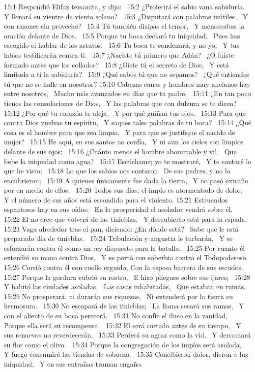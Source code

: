 15:1 Respondió Elifaz temanita, y dijo:  
15:2 ¿Proferirá el sabio vana sabiduría,  
Y llenará su vientre de viento solano?  
15:3 ¿Disputará con palabras inútiles,  
Y con razones sin provecho?  
15:4 Tú también disipas el temor,  
Y menoscabas la oración delante de Dios.  
15:5 Porque tu boca declaró tu iniquidad,  
Pues has escogido el hablar de los astutos.  
15:6 Tu boca te condenará, y no yo;  
Y tus labios testificarán contra ti.  
15:7 ¿Naciste tú primero que Adán?  
¿O fuiste formado antes que los collados?  
15:8 ¿Oíste tú el secreto de Dios,  
Y está limitada a ti la sabiduría?  
15:9 ¿Qué sabes tú que no sepamos?  
¿Qué entiendes tú que no se halle en nosotros? 
15:10 Cabezas canas y hombres muy ancianos hay entre nosotros,  
Mucho más avanzados en días que tu padre.  
15:11 ¿En tan poco tienes las consolaciones de Dios,  
Y las palabras que con dulzura se te dicen?  
15:12 ¿Por qué tu corazón te aleja,  
Y por qué guiñan tus ojos,  
15:13 Para que contra Dios vuelvas tu espíritu,  
Y saques tales palabras de tu boca?  
15:14 ¿Qué cosa es el hombre para que sea limpio,  
Y para que se justifique el nacido de mujer?  
15:15 He aquí, en sus santos no confía,  
Y ni aun los cielos son limpios delante de sus ojos;  
15:16 ¿Cuánto menos el hombre abominable y vil,  
Que bebe la iniquidad como agua?  
15:17 Escúchame; yo te mostraré,  
Y te contaré lo que he visto;  
15:18 Lo que los sabios nos contaron  
De sus padres, y no lo encubrieron;  
15:19 A quienes únicamente fue dada la tierra,  
Y no pasó extraño por en medio de ellos.  
15:20 Todos sus días, el impío es atormentado de dolor,  
Y el número de sus años está escondido para el violento. 
15:21 Estruendos espantosos hay en sus oídos;  
En la prosperidad el asolador vendrá sobre él.  
15:22 El no cree que volverá de las tinieblas,  
Y descubierto está para la espada.  
15:23 Vaga alrededor tras el pan, diciendo: ¿En dónde está?  
Sabe que le está preparado día de tinieblas.  
15:24 Tribulación y angustia le turbarán,  
Y se esforzarán contra él como un rey dispuesto para la batalla,  
15:25 Por cuanto él extendió su mano contra Dios,  
Y se portó con soberbia contra el Todopoderoso.  
15:26 Corrió contra él con cuello erguido, 
Con la espesa barrera de sus escudos.  
15:27 Porque la gordura cubrió su rostro,  
E hizo pliegues sobre sus ijares;  
15:28 Y habitó las ciudades asoladas,  
Las casas inhabitadas,  
Que estaban en ruinas.  
15:29 No prosperará, ni durarán sus riquezas,  
Ni extenderá por la tierra su hermosura.  
15:30 No escapará de las tinieblas;  
La llama secará sus ramas,  
Y con el aliento de su boca perecerá.  
15:31 No confíe el iluso en la vanidad,  
Porque ella será su recompensa.  
15:32 El será cortado antes de su tiempo,  
Y sus renuevos no reverdecerán.  
15:33 Perderá su agraz como la vid,  
Y derramará su flor como el olivo.  
15:34 Porque la congregación de los impíos será asolada,  
Y fuego consumirá las tiendas de soborno.  
15:35 Concibieron dolor, dieron a luz iniquidad,  
Y en sus entrañas traman engaño.  
